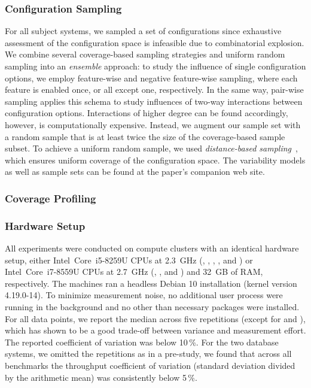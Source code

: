 \subsubsection{Configuration Sampling}
For all subject systems, we sampled a set of configurations since exhaustive assessment of the configuration space is infeasible due to combinatorial explosion. We combine several coverage-based sampling strategies and uniform random sampling into an \emph{ensemble} approach: to study the influence of single configuration options, we employ feature-wise and negative feature-wise sampling, where each feature is enabled once, or all except one, respectively. In the same way, pair-wise sampling applies this schema to study influences of two-way interactions between configuration options. Interactions of higher degree can be found accordingly, however, is computationally expensive. Instead, we augment our sample set with a random sample that is at least twice the size of the coverage-based sample subset. To achieve a uniform random sample, we used \emph{distance-based sampling}~\cite{kaltenecker_distance-based_2019}, which ensures uniform coverage of the configuration space. The variability models as well as sample sets can be found at the paper's companion web site.

\subsubsection{Coverage Profiling}\label{sec:profiling}

\subsubsection{Hardware Setup}
All experiments were conducted on compute clusters with an identical hardware setup, either Intel~Core~i5-8259U CPUs at 2.3~GHz (, , , , and ) or Intel~Core~i7-8559U CPUs at 2.7~GHz (, , and ) and 32~GB of RAM, respectively. The machines ran a headless Debian 10 installation (kernel version \mbox{4.19.0-14}). To minimize measurement noise, no additional user process were running in the background and no other than necessary packages were installed.
For all data points, we report the median across five repetitions (except for  and ), which has shown to be a good trade-off between variance and measurement effort. The reported coefficient of variation was below {\color{Red}10\,\%}. For the two database systems, we omitted the repetitions as in a pre-study, we found that across all benchmarks the throughput coefficient of variation (standard deviation divided by the arithmetic mean) was consistently below 5\,\%.

